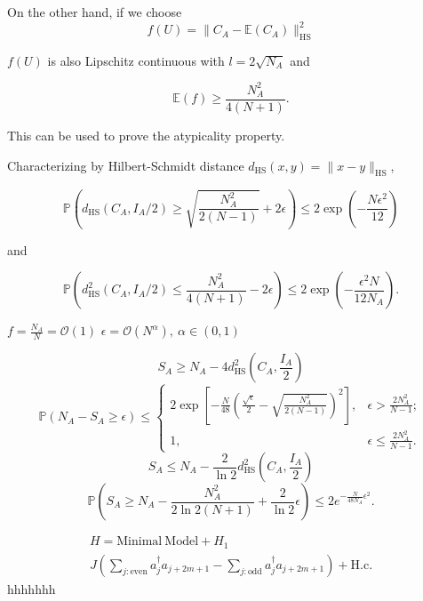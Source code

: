 \documentclass{beamer}
\begin{document}
\begin{frame}
   On the other hand, if we choose \[f(U)=\|C_{A}-\mathbb{E}(C_{A})\|_{\mathrm{HS}}^{2}\]

$f(U)$ is also Lipschitz continuous with $l=2\sqrt{N_{A}}$ and

\[\mathbb{E}(f)\geq\frac{N_{A}^{2}}{4(N+1)}.\]

This can be used to prove the atypicality property.
\end{frame}
\begin{frame}
   Characterizing by Hilbert-Schmidt distance $d_{\mathrm{HS}}(x,y)=\|x-y\|_{\mathrm{HS}}$,

\[\mathbb{P}\left(d_{\mathrm{HS}}(C_{A},I_{A}/2)\geq\sqrt{\frac{N_{A}^{2}}{2(N-1)}}+2\epsilon\right)\leq2\exp\left(-\frac{N\epsilon^{2}}{12}\right)\]

and 

\[\mathbb{\mathbb{P}}\left(d_{\mathrm{HS}}^{2}(C_{A},I_{A}/2)\leq\frac{N_{A}^{2}}{4(N+1)}-2\epsilon\right)\leq2\exp\left(-\frac{\epsilon^{2}N}{12N_{A}}\right).\]

\end{frame}
\begin{frame}
   $f=\frac{N_A}{N}=\mathcal{O}(1)$
   $\epsilon=\mathcal{O}(N^{\alpha}),\ \alpha\in(0,1)$
\end{frame}
\begin{frame}
   \[
      S_A\geq N_A-4d^2_{\mathrm{HS}}\left(C_A,\frac{I_A}{2}\right)
   \]
   \[
      \mathbb{P}(N_{A}-S_{A}\geq\epsilon) \leq\begin{cases}
2\exp\left[-\frac{N}{48}\left(\frac{\sqrt{\epsilon}}{2}-\sqrt{\frac{N_{A}^{2}}{2(N-1)}}\right)^{2}\right], & \epsilon>\frac{2N_{A}^{2}}{N-1};\\
1, & \epsilon\leq\frac{2N_{A}^{2}}{N-1}.
\end{cases}
      \]
   \[
      S_A\leq N_A-\frac{2}{\ln{2}}d_{\mathrm{HS}}^2\left(C_A,\frac{I_A}{2}\right)
      \]
      \[
         \mathbb{P}\left(S_{A}\geq N_{A}-\frac{N_{A}^{2}}{2\ln2(N+1)}+\frac{2}{\ln2}\epsilon\right)  \leq2e^{-\frac{N}{48N_{A}}\epsilon^{2}}.
         \]
\end{frame}
\begin{frame}
   \begin{align*}
      H=\mathrm{Minimal\ Model}+H_1 
   \\
      J(\sum_{j:\mathrm{even}}a_{j}^{\dagger}a_{j+2m+1}-\sum_{j:\mathrm{odd}}a_{j}^{\dagger}a_{j+2m+1})+\mathrm{H.c.}
   \end{align*}
      hhhhhhh
\end{frame}
\end{document}
